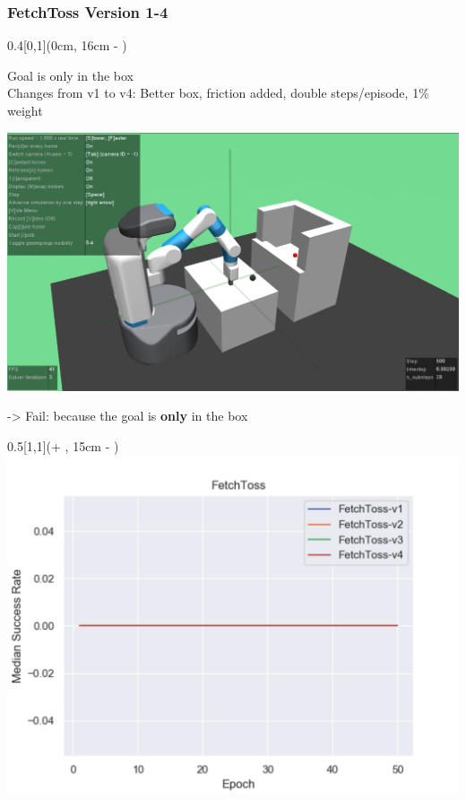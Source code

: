 





\begin{frame}
	\frametitle{FetchToss Version 1-4}	
	\vspace{1cm}
	
	
	\begin{textblock*}{0.4\paperwidth}[0,1](0cm, 16cm - \PraesentationSeitenrand)%
		
		Goal is only in the box \\
		Changes from v1 to v4: Better box, friction added, double steps/episode, 1\% weight
		
		\includegraphics[width=0.4\paperwidth]{./Ressourcen/Figures/FetchToss-v3.pdf}
		
		
		
		-> Fail: because the goal is \textbf{only} in the box
		
	\end{textblock*}
	
	\begin{textblock*}{0.5\paperwidth}[1,1](\textwidth + \PraesentationSeitenrand, 15cm - \PraesentationSeitenrand)%
		\includegraphics[width=0.5\paperwidth]{./Ressourcen/Figures/fig_FetchToss-v1-v4.pdf}
		


\end{textblock*}
\end{frame}

